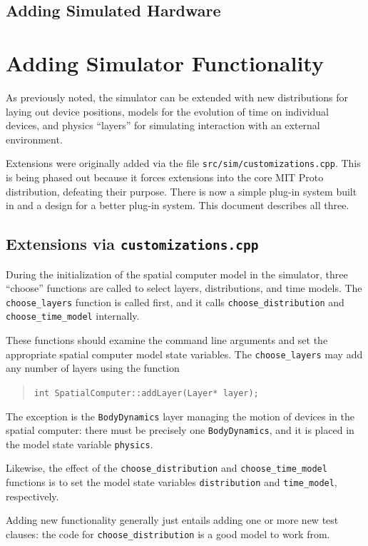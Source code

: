 \documentclass{article}
\newcommand\code[1]{\begin{quote}\var{#1}\end{quote}}
\newcommand\var[1]{{\tt #1}}
\begin{document}
\subsection{Adding Simulated Hardware}

\section{Adding Simulator Functionality}

As previously noted, the simulator can be extended with new
distributions for laying out device positions, models for the
evolution of time on individual devices, and physics ``layers'' for
simulating interaction with an external environment.  

Extensions were originally added via the file
\var{src/sim/customizations.cpp}.  This is being phased out because it
forces extensions into the core MIT Proto distribution, defeating
their purpose.  There is now a simple plug-in system built in and a
design for a better plug-in system.  This document describes all
three.

\subsection{Extensions via {\tt customizations.cpp}}

During the initialization of the spatial computer model in the
simulator, three ``choose'' functions are called to select layers,
distributions, and time models.  The \var{choose\_layers} function is
called first, and it calls \var{choose\_distribution} and
\var{choose\_time\_model} internally.

These functions should examine the command line arguments and set the
appropriate spatial computer model state variables.  The
\var{choose\_layers} may add any number of layers using the function
\code{int SpatialComputer::addLayer(Layer* layer);}  The exception is
the \var{BodyDynamics} layer managing the motion of devices in the
spatial computer: there must be precisely one \var{BodyDynamics}, and
it is placed in the model state variable {\tt physics}.  

Likewise, the effect of the \var{choose\_distribution} and
\var{choose\_time\_model} functions is to set the model state
variables \var{distribution} and \var{time\_model}, respectively.

Adding new functionality generally just entails adding one or more new
test clauses: the code for \var{choose\_distribution} is a good model
to work from.
\end{document}
